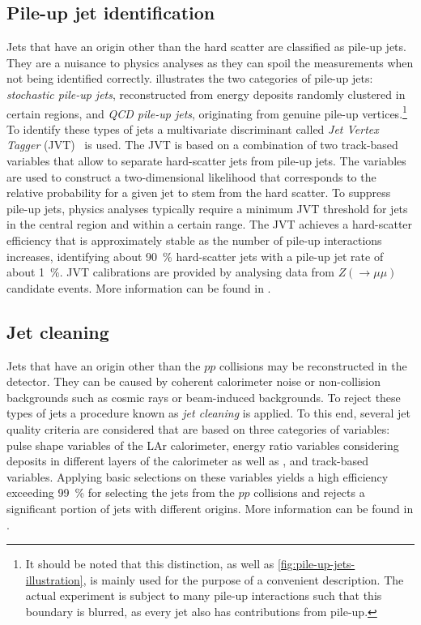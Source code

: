 \subsection{Pile-up jet identification}
Jets that have an origin other than the hard scatter are classified as pile-up jets.
They are a nuisance to physics analyses as they can spoil the measurements when not being identified correctly.
 illustrates the two categories of pile-up jets:
\emph{stochastic pile-up jets}, reconstructed from energy deposits randomly clustered in certain regions, and \emph{QCD pile-up jets}, originating from genuine pile-up vertices.\footnote{It should be noted that this distinction, as well as \cref{fig:pile-up-jets-illustration}, is mainly used for the purpose of a convenient description. The actual experiment is subject to many pile-up interactions such that this boundary is blurred, as every jet also has contributions from pile-up.}
To identify these types of jets a multivariate discriminant called \emph{Jet Vertex Tagger} (JVT)~\cite{ATLAS-CONF-2014-018} is used.
The JVT is based on a combination of two track-based variables that allow to separate hard-scatter jets from pile-up jets. The variables are used to construct a two-dimensional likelihood that corresponds to the relative probability for a given jet to stem from the hard scatter.
To suppress pile-up jets, physics analyses typically require a minimum JVT threshold for jets in the central region  and within a certain \pT range.
The JVT achieves a hard-scatter efficiency that is approximately stable as the number of pile-up interactions increases, identifying about \SI{90}{\percent} hard-scatter jets with a pile-up jet rate of about \SI{1}{\percent}.
JVT calibrations are provided by analysing data from $Z (\rightarrow \mu\mu)$ candidate events.
More information can be found in .


\subsection{Jet cleaning}
Jets that have an origin other than the $pp$ collisions may be reconstructed in the detector. They can be caused by coherent calorimeter noise or non-collision backgrounds such as cosmic rays or beam-induced backgrounds. To reject these types of jets a procedure known as \emph{jet cleaning} is applied. To this end, several jet quality criteria are considered that are based on three categories of variables: pulse shape variables of the LAr calorimeter, energy ratio variables considering deposits in different layers of the calorimeter as well as \fEM, and track-based variables.
Applying basic selections on these variables yields a high efficiency exceeding \SI{99}{\percent} for selecting the jets from the $pp$ collisions and rejects a significant portion of jets with different origins. More information can be found in .


